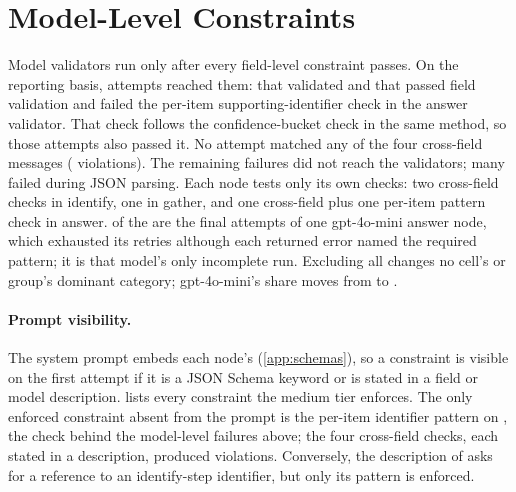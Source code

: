 \begin{table}[htbp]
\centering\scriptsize
\caption{Dominant category and fence-strip outcome by cell.
\emph{Pure/wrapped} is pure-formatting wrapped failures over all wrapped
failures. Dominant shares for cells with few failures are descriptive
only.}
\label{tab:domain}
\resizebox{\linewidth}{!}{}
\end{table}

\section{Model-Level Constraints}
\label{app:crossfield}

Model validators run only after every field-level constraint passes.
On the reporting basis,  attempts reached them:
 that validated and 
that passed field validation and failed the per-item
supporting-identifier check in the answer validator. That check follows
the confidence-bucket check in the same method, so those attempts also
passed it. No attempt matched any of the four cross-field messages
( violations). The remaining
 failures did not reach the validators; many
failed during JSON parsing. Each node tests only its own checks: two
cross-field checks in identify, one in gather, and one cross-field plus
one per-item pattern check in answer.  of the
 are the final attempts of one gpt-4o-mini answer node, which
exhausted its retries although each returned error named the required
pattern; it is that model's only incomplete run. Excluding all
 changes no cell's or group's dominant category; gpt-4o-mini's
 share moves from
 to
.

\paragraph{Prompt visibility.}
The system prompt embeds each node's 
(\cref{app:schemas}), so a constraint is visible on the first attempt
if it is a JSON Schema keyword or is stated in a field or model
description.  lists every constraint the medium
tier enforces. The only enforced constraint absent from the prompt is
the per-item identifier pattern on , the
check behind the  model-level failures above;
the four cross-field checks, each stated in a description, produced
 violations. Conversely, the description of
 asks for a reference to an identify-step
identifier, but only its pattern is enforced.

